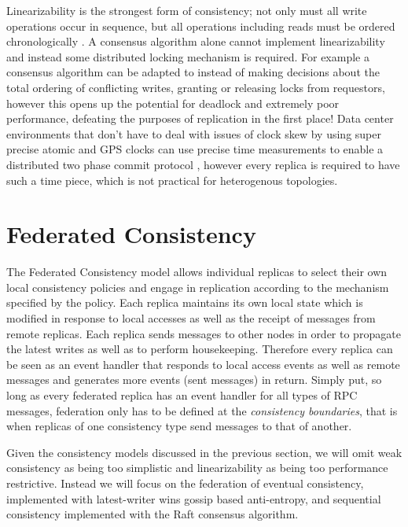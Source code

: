 \documentclass[10pt,conference,compsocconf,letterpaper]{IEEEtran}
\begin{document}
Linearizability is the strongest form of consistency; not only must all write operations occur in sequence, but all operations including reads must be ordered chronologically \cite{herlihy_linearizability:_1990}. A consensus algorithm alone cannot implement linearizability and instead some distributed locking mechanism is required. For example a consensus algorithm can be adapted to instead of making decisions about the total ordering of conflicting writes, granting or releasing locks from requestors, however this opens up the potential for deadlock and extremely poor performance, defeating the purposes of replication in the first place! Data center environments that don't have to deal with issues of clock skew by using super precise atomic and GPS clocks can use precise time measurements to enable a distributed two phase commit protocol \cite{corbett_spanner:_2013}, however every replica is required to have such a time piece, which is not practical for heterogenous topologies.

\section{Federated Consistency}

The Federated Consistency model allows individual replicas to select their own local consistency policies and engage in replication according to the mechanism specified by the policy. Each replica maintains its own local state which is modified in response to local accesses as well as the receipt of messages from remote replicas. Each replica sends messages to other nodes in order to propagate the latest writes as well as to perform housekeeping. Therefore every replica can be seen as an event handler that responds to local access events as well as remote messages and generates more events (sent messages) in return. Simply put, so long as every federated replica has an event handler for all types of RPC messages, federation only has to be defined at the \textit{consistency boundaries}, that is when replicas of one consistency type send messages to that of another.

Given the consistency models discussed in the previous section, we will omit weak consistency as being too simplistic and linearizability as being too performance restrictive. Instead we will focus on the federation of eventual consistency, implemented with latest-writer wins gossip based anti-entropy, and sequential consistency implemented with the Raft consensus algorithm.
\end{document}

